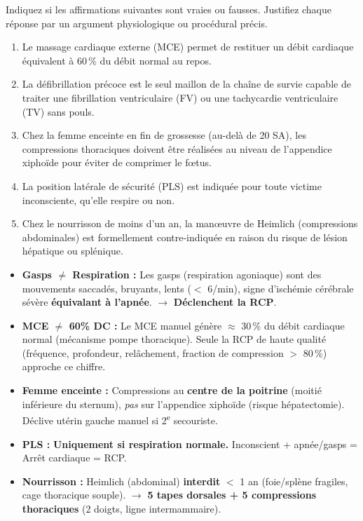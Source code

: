 \documentclass[11pt]{article}
\begin{document}
\begin{exercice}
Indiquez si les affirmations suivantes sont vraies ou fausses. Justifiez chaque réponse par un argument physiologique ou procédural précis.
\begin{enumerate}
    \item Le massage cardiaque externe (MCE) permet de restituer un débit cardiaque équivalent à 60\,\% du débit normal au repos.
    \item La défibrillation précoce est le seul maillon de la chaîne de survie capable de traiter une fibrillation ventriculaire (FV) ou une tachycardie ventriculaire (TV) sans pouls.
    \item Chez la femme enceinte en fin de grossesse (au-delà de 20 SA), les compressions thoraciques doivent être réalisées au niveau de l'appendice xiphoïde pour éviter de comprimer le fœtus.
    \item La position latérale de sécurité (PLS) est indiquée pour toute victime inconsciente, qu'elle respire ou non.
    \item Chez le nourrisson de moins d'un an, la manœuvre de Heimlich (compressions abdominales) est formellement contre-indiquée en raison du risque de lésion hépatique ou splénique.
\end{enumerate}
\end{exercice}

\begin{attention}
\begin{itemize}
    \item \textbf{Gasps $\neq$ Respiration :} Les gasps (respiration agoniaque) sont des mouvements saccadés, bruyants, lents ($<$ 6/min), signe d'ischémie cérébrale sévère \textbf{équivalant à l'apnée}. $\rightarrow$ \textbf{Déclenchent la RCP}.
    \item \textbf{MCE $\neq$ 60\% DC :} Le MCE manuel génère $\approx$ 30\,\% du débit cardiaque normal (mécanisme pompe thoracique). Seule la RCP de haute qualité (fréquence, profondeur, relâchement, fraction de compression $>$ 80\,\%) approche ce chiffre.
    \item \textbf{Femme enceinte :} Compressions au \textbf{centre de la poitrine} (moitié inférieure du sternum), \emph{pas} sur l'appendice xiphoïde (risque hépatectomie). Déclive utérin gauche manuel si 2\textsuperscript{e} secouriste.
    \item \textbf{PLS :} \textbf{Uniquement si respiration normale.} Inconscient + apnée/gasps = Arrêt cardiaque = RCP.
    \item \textbf{Nourrisson :} Heimlich (abdominal) \textbf{interdit} $<$ 1 an (foie/splène fragiles, cage thoracique souple). $\rightarrow$ \textbf{5 tapes dorsales + 5 compressions thoraciques} (2 doigts, ligne intermammaire).
\end{itemize}
\end{attention}
\end{document}

